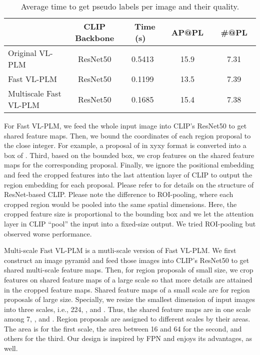 \documentclass[runningheads]{llncs}
\begin{document}
\begin{table}\begin{center}
\caption{Average time to get pseudo labels per image and their quality.} \label{tab:avg_time_PLs}
\begin{tabular}{l c c c c}
    \toprule
    {\bf } & { CLIP Backbone} & { \ Time (s)\ } & { \ AP@PL\ } &{ \ \#@PL\ }\\
    \hline
    { Original VL-PLM} & ResNet50 & 0.5413 & 15.9 & 7.31 \\
    { Fast VL-PLM } & ResNet50 & 0.1199 & 13.5 & 7.39 \\
    { Multiscale Fast VL-PLM} & ResNet50 & 0.1685 & 15.4 & 7.38 \\
    \bottomrule
    \end{tabular}
\end{center}
\end{table}

For Fast VL-PLM, we feed the whole input image into CLIP's ResNet50 to get shared feature maps. Then, we bound the coordinates of each region proposal to the close integer. For example, a proposal of  in xyxy format is converted into a box of . Third, based on the bounded box, we crop features on the shared feature maps for the corresponding proposal.
Finally, we ignore the positional embedding and feed the cropped features into the last attention layer of CLIP to output the region embedding for each proposal. 
Please refer to \cite{radford_arxiv_2021} for details on the structure of ResNet-based CLIP.
Please note the difference to ROI-pooling, where each cropped region would be pooled into the same spatial dimensions. Here, the cropped feature size is proportional to the bounding box and we let the attention layer in CLIP ``pool'' the input into a fixed-size output. We tried ROI-pooling but observed worse performance.

Multi-scale Fast VL-PLM is a mutli-scale version of Fast VL-PLM.
We first construct an image pyramid and feed those images into CLIP's ResNet50 to get shared multi-scale feature maps. 
Then, for region proposals of small size, we crop features on shared feature maps of a large scale so that more details are attained in the cropped feature maps. Shared feature maps of a small scale are for region proposals of large size. 
Specially, we resize the smallest dimension of input images into three scales, i.e., 224, , and . Thus, the shared feature maps are in one scale among 7, , and .
Region proposals are assigned to different scales by their areas. The area  is for the first scale, the area between 16 and 64 for the second, and others for the third.
Our design is inspired by FPN \cite{lin_cvpr_17_fpn} and enjoys its advantages, as well.
\end{document}
